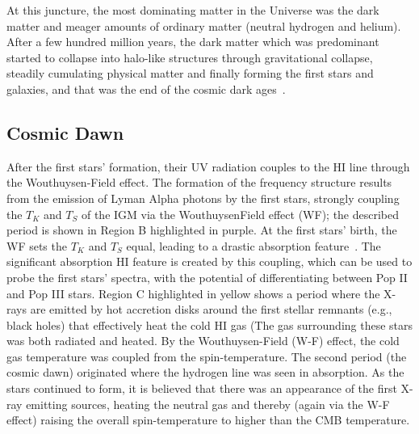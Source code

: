 	At this juncture, the most dominating matter in the Universe was the dark matter and meager amounts of ordinary matter (neutral hydrogen and helium). After a few hundred million years, the dark matter which was predominant started to collapse into halo-like structures through gravitational collapse, steadily cumulating physical matter and finally forming the first stars and galaxies, and that was the end of the cosmic dark ages~\citep{2003Sci...300.1904M}.
	
	
	\subsection{Cosmic Dawn}
	    
	    After the first stars' formation, their UV radiation couples to the HI line through the Wouthuysen-Field effect. The formation of the frequency structure results from the emission of Lyman Alpha photons by the first stars, strongly coupling the $T_K$ and $T_S$ of the IGM via the WouthuysenField effect (WF); the described period is shown in Region B highlighted in purple. At the first stars' birth, the WF sets the $ T_K $ and $ T_S $ equal, leading to a drastic absorption feature~\citep{2014ApJ...782L...9V}. The significant absorption HI feature is created by this coupling, which can be used to probe the first stars' spectra, with the potential of differentiating between Pop II and Pop III stars. Region C highlighted in yellow shows a period where the X-rays are emitted by hot accretion disks around the first stellar remnants (e.g., black holes) that effectively heat the cold HI gas (The gas surrounding these stars was both radiated and heated. By the Wouthuysen-Field (W-F) effect, the cold gas temperature was coupled from the spin-temperature. The second period (the cosmic dawn)  originated where the hydrogen line was seen in absorption. As the stars continued to form, it is believed that there was an appearance of the first X-ray emitting sources, heating the neutral gas and thereby (again via the W-F effect) raising the overall spin-temperature to higher than the CMB temperature.\\
	    
